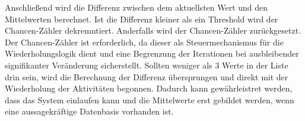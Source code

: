 \documentclass{article}
\begin{document}
    Anschließend wird die Differenz zwischen dem aktuellsten Wert und den Mittelwerten berechnet. 
    Ist die Differenz kleiner als ein Threshold wird der Chancen-Zähler dekremntiert. 
    Anderfalls wird der Chancen-Zähler zurückgesetzt.
    Der Chancen-Zähler ist erforderlich, da dieser als Steuermechanismus für die Wiederholungslogik dient und eine Begrenzung der Iterationen bei ausbleibender signifikanter Veränderung sicherstellt.
    Sollten weniger als 3 Werte in der Liste drin sein, wird die Berechnung der Differenz übersprungen und direkt mit der Wiederholung der Aktivitäten begonnen.
    Dadurch kann gewährleistret werden, dass das System einlaufen kann und die Mittelwerte erst gebildet werden, wenn eine aussagekräftige Datenbasis vorhanden ist.\\
    \\
\end{document}
